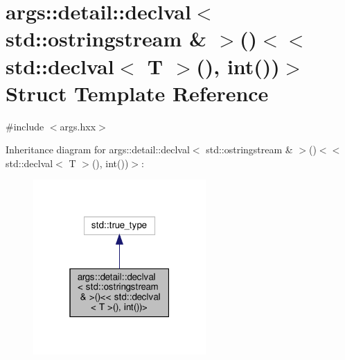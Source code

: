 \hypertarget{structargs_1_1detail_1_1_is_convertable_to_string_3_01_t_00_01decltype_07std_1_1declval_3_01std_17020eddea127ea35668e82953e3d8bb}{}\section{args\+:\+:detail\+:\+:declval$<$ std\+:\+:ostringstream \& $>$()$<$$<$ std\+:\+:declval$<$ T $>$(), int())$>$ Struct Template Reference}
\label{structargs_1_1detail_1_1_is_convertable_to_string_3_01_t_00_01decltype_07std_1_1declval_3_01std_17020eddea127ea35668e82953e3d8bb}


{\ttfamily \#include $<$args.\+hxx$>$}



Inheritance diagram for args\+:\+:detail\+:\+:declval$<$ std\+:\+:ostringstream \& $>$()$<$$<$ std\+:\+:declval$<$ T $>$(), int())$>$\+:\nopagebreak
\begin{figure}[H]
\begin{center}
\leavevmode
\includegraphics[width=187pt]{structargs_1_1detail_1_1_is_convertable_to_string_3_01_t_00_01decltype_07std_1_1declval_3_01std_d241314a81ccccd714662290b09817f7}
\end{center}
\end{figure}


